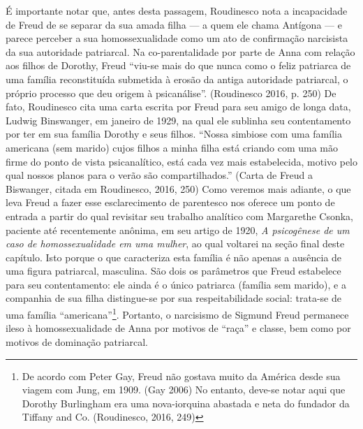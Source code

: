 É importante notar que, antes desta passagem, Roudinesco nota a
incapacidade de Freud de se separar da sua amada filha --- a quem ele
chama Antígona --- e parece perceber a sua homossexualidade como um ato
de confirmação narcisista da sua autoridade patriarcal. Na
co-parentalidade por parte de Anna com relação aos filhos de Dorothy,
Freud ``viu-se mais do que nunca como o feliz patriarca de uma família
reconstituída submetida à erosão da antiga autoridade patriarcal, o
próprio processo que deu origem à psicanálise''. (Roudinesco 2016, p.
250) De fato, Roudinesco cita uma carta escrita por Freud para seu amigo
de longa data, Ludwig Binswanger, em janeiro de 1929, na qual ele
sublinha seu contentamento por ter em sua família Dorothy e seus filhos.
``Nossa simbiose com uma família americana (sem marido) cujos filhos a
minha filha está criando com uma mão firme do ponto de vista
psicanalítico, está cada vez mais estabelecida, motivo pelo qual nossos
planos para o verão são compartilhados.'' (Carta de Freud a Biswanger,
citada em Roudinesco, 2016, 250) Como veremos mais adiante, o que leva
Freud a fazer esse esclarecimento de parentesco nos oferece um ponto de
entrada a partir do qual revisitar seu trabalho analítico com Margarethe
Csonka, paciente até recentemente anônima, em seu artigo de 1920,
\emph{A psicogênese de um caso de homossexualidade em uma mulher}, ao
qual voltarei na seção final deste capítulo. Isto porque o que
caracteriza esta família é não apenas a ausência de uma figura
patriarcal, masculina. São dois os parâmetros que Freud estabelece para
seu contentamento: ele ainda é o único patriarca (família sem marido), e
a companhia de sua filha distingue-se por sua respeitabilidade social:
trata-se de uma família ``americana''\footnote{De acordo com Peter Gay,
  Freud não gostava muito da América desde sua viagem com Jung, em 1909.
  (Gay 2006) No entanto, deve-se notar aqui que Dorothy Burlingham era
  uma nova-iorquina abastada e neta do fundador da Tiffany and Co.
  (Roudinesco, 2016, 249)}. Portanto, o narcisismo de Sigmund Freud
permanece ileso à homossexualidade de Anna por motivos de ``raça'' e
classe, bem como por motivos de dominação patriarcal.

